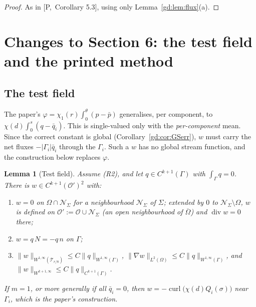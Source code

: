 \documentclass[11pt,reqno]{amsart}
\theoremstyle{plain}
\newtheorem{lemma}[theorem]{Lemma}
\theoremstyle{definition}
\newcommand{\pbar}{\bar p}
\newcommand{\norm}[1]{\lVert #1\rVert}
\newcommand{\curl}{\operatorname{curl}}
\renewcommand{\div}{\operatorname{div}}
\newcommand{\Pref}[1]{\textup{[P,~#1]}}
\begin{document}
\begin{proof}
As in \Pref{Corollary 5.3}, using only Lemma~\ref{gd:lem:flux}(a).
\end{proof}

\section{Changes to Section 6: the test field and the printed method}\label{gd:sec:test}

\subsection{The test field}
The paper's $\varphi=\chi_1(r)\int_0^\theta(p-\pbar)$ generalises, per component, to $\chi(d)\int_0^s(q-\bar q_i)$. This is single-valued only with the \emph{per-component} mean. Since the correct constant is global (Corollary~\ref{gd:cor:GSerr}), $w$ must carry the net fluxes $-|\Gamma_i|\bar q_i$ through the $\Gamma_i$. Such a $w$ has no global stream function, and the construction below replaces $\varphi$.

\begin{lemma}[Test field]\label{gd:lem:w}
Assume (R2), and let $q\in C^{k+1}(\Gamma)$ with $\int_\Gamma q=0$. There is $w\in C^{k+1}(\mathcal O')^2$ with:
\begin{enumerate}[label=(\alph*)]
\item $w=0$ on $\Omega\cap\mathcal N_\Sigma$ for a neighbourhood $\mathcal N_\Sigma$ of $\Sigma$; extended by $0$ to $\mathcal N_\Sigma\setminus\Omega$, $w$ is defined on $\mathcal O':=\mathcal O\cup\mathcal N_\Sigma$ (an open neighbourhood of $\overline\Omega$) and $\div w=0$ there;
\item $w=q\,N=-q\,n$ on $\Gamma$;
\item $\norm{w}_{W^{1,\infty}(\mathcal T_{r/8})}\le C\norm{q}_{W^{1,\infty}(\Gamma)}$, $\norm{\nabla w}_{L^2(\Omega)}\le C\norm q_{W^{1,\infty}(\Gamma)}$, and $\norm{w}_{W^{k+1,\infty}}\le C\norm{q}_{C^{k+1}(\Gamma)}$.
\end{enumerate}
If $m=1$, or more generally if all $\bar q_i=0$, then $w=-\curl\bigl(\chi(d)Q_i(\sigma)\bigr)$ near $\Gamma_i$, which is the paper's construction.
\end{lemma}
\end{document}
